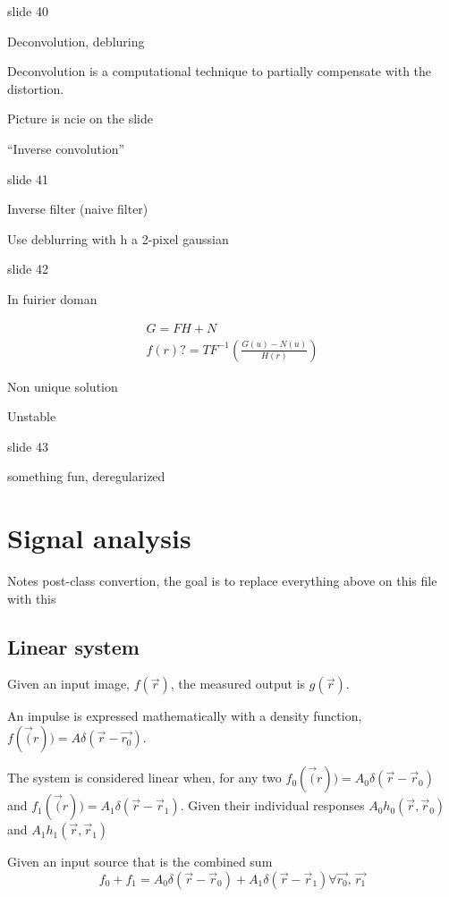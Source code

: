 \documentclass[../main/main.tex]{subfiles}
\begin{document}
slide 40

Deconvolution, debluring

Deconvolution is a computational technique to partially compensate with the distortion.

Picture is ncie on the slide

``Inverse convolution''

slide 41

Inverse filter (naive filter)

Use deblurring with  h a 2-pixel gaussian

slide 42

In fuirier doman

\begin{align}
	G = FH + N \\
	f(r)? = TF^{-1}\left(\frac{G(u)- N(u)}{H(r)}\right)
\end{align}

Non unique solution

Unstable

slide 43

something fun, deregularized


\chapter{Signal analysis}

Notes post-class convertion, the goal is to replace everything above on this file with this



\section{Linear system}
Given an input image, $f(\vec{r})$, the measured output is $g(\vec{r})$.

An impulse is expressed mathematically with a density function, $f(\vec(r)) = A \delta(\vec{r} - \vec{r_0})$.

The system is considered linear when, for any two
$f_0(\vec(r)) = A_0 \delta(\vec{r} - \vec{r}_0)$ and
$f_1(\vec(r)) = A_1 \delta(\vec{r} - \vec{r}_1)$. Given their individual responses
$A_0 h_0(\vec{r}, \vec{r}_0)$ and
$A_1 h_1(\vec{r}, \vec{r}_1)$

Given an input source that is the combined sum
\begin{equation}
	f_0 + f_1 =
	A_0 \delta(\vec{r} - \vec{r}_0)
	+ A_1 \delta(\vec{r} - \vec{r}_1)
	\forall \vec{r_0}, \, \vec{r_1}
\end{equation}
\end{document}
